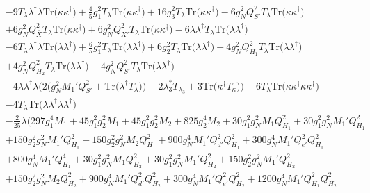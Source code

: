 {\begin{align}
 &-9 {T_{\lambda}  \lambda^{\dagger}  \lambda} \mbox{Tr}\Big({\kappa  \kappa^{\dagger}}\Big) +\frac{4}{5} g_{1}^{2} T_{\lambda} \mbox{Tr}\Big({\kappa  \kappa^{\dagger}}\Big) +16 g_{3}^{2} T_{\lambda} \mbox{Tr}\Big({\kappa  \kappa^{\dagger}}\Big) -6 g_{N}^{2} Q_{S'}^{2} T_{\lambda} \mbox{Tr}\Big({\kappa  \kappa^{\dagger}}\Big) \nonumber \\ 
 &+6 g_{N}^{2} Q_{\bar{X}}^{2} T_{\lambda} \mbox{Tr}\Big({\kappa  \kappa^{\dagger}}\Big) +6 g_{N}^{2} Q_{X'}^{2} T_{\lambda} \mbox{Tr}\Big({\kappa  \kappa^{\dagger}}\Big) -6 {\lambda  \lambda^{\dagger}  T_{\lambda}} \mbox{Tr}\Big({\lambda  \lambda^{\dagger}}\Big) \nonumber \\ 
 &-6 {T_{\lambda}  \lambda^{\dagger}  \lambda} \mbox{Tr}\Big({\lambda  \lambda^{\dagger}}\Big) +\frac{6}{5} g_{1}^{2} T_{\lambda} \mbox{Tr}\Big({\lambda  \lambda^{\dagger}}\Big) +6 g_{2}^{2} T_{\lambda} \mbox{Tr}\Big({\lambda  \lambda^{\dagger}}\Big) +4 g_{N}^{2} Q_{H_1}^{2} T_{\lambda} \mbox{Tr}\Big({\lambda  \lambda^{\dagger}}\Big) \nonumber \\ 
 &+4 g_{N}^{2} Q_{H_2}^{2} T_{\lambda} \mbox{Tr}\Big({\lambda  \lambda^{\dagger}}\Big) -4 g_{N}^{2} Q_{S'}^{2} T_{\lambda} \mbox{Tr}\Big({\lambda  \lambda^{\dagger}}\Big) \nonumber \\ 
 &-4 {\lambda  \lambda^{\dagger}  \lambda} \Big(2 \Big(g_{N}^{2} M_1' Q_{S'}^{2}  + \mbox{Tr}\Big({\lambda^{\dagger}  T_{\lambda}}\Big)\Big) + 2 \lambda_3^* T_{\lambda_3}  + 3 \mbox{Tr}\Big({\kappa^{\dagger}  T_{\kappa}}\Big) \Big)-6 T_{\lambda} \mbox{Tr}\Big({\kappa  \kappa^{\dagger}  \kappa  \kappa^{\dagger}}\Big) \nonumber \\ 
 &-4 T_{\lambda} \mbox{Tr}\Big({\lambda  \lambda^{\dagger}  \lambda  \lambda^{\dagger}}\Big) \nonumber \\ 
 &-\frac{2}{25} \lambda \Big(297 g_{1}^{4} M_1 +45 g_{1}^{2} g_{2}^{2} M_1 +45 g_{1}^{2} g_{2}^{2} M_2 +825 g_{2}^{4} M_2 +30 g_{1}^{2} g_{N}^{2} M_1 Q_{H_1}^{2} +30 g_{1}^{2} g_{N}^{2} M_1' Q_{H_1}^{2} \nonumber \\ 
 &+150 g_{2}^{2} g_{N}^{2} M_1' Q_{H_1}^{2} +150 g_{2}^{2} g_{N}^{2} M_2 Q_{H_1}^{2} +900 g_{N}^{4} M_1' Q_{d'}^{2} Q_{H_1}^{2} +300 g_{N}^{4} M_1' Q_{e'}^{2} Q_{H_1}^{2} \nonumber \\ 
 &+800 g_{N}^{4} M_1' Q_{H_1}^{4} +30 g_{1}^{2} g_{N}^{2} M_1 Q_{H_2}^{2} +30 g_{1}^{2} g_{N}^{2} M_1' Q_{H_2}^{2} +150 g_{2}^{2} g_{N}^{2} M_1' Q_{H_2}^{2} \nonumber \\ 
 &+150 g_{2}^{2} g_{N}^{2} M_2 Q_{H_2}^{2} +900 g_{N}^{4} M_1' Q_{d'}^{2} Q_{H_2}^{2} +300 g_{N}^{4} M_1' Q_{e'}^{2} Q_{H_2}^{2} +1200 g_{N}^{4} M_1' Q_{H_1}^{2} Q_{H_2}^{2} \nonumber \\ 

\end{align}}
